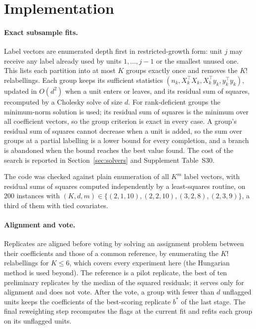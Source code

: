 \appendix

\section{Implementation}
\label{app:implementation}

\paragraph{Exact subsample fits.}
Label vectors are enumerated depth first in restricted-growth form: unit $j$ may receive any
label already used by units $1,\dots,j-1$ or the smallest unused one. This lists each
partition into at most $K$ groups exactly once and removes the $K!$ relabellings. Each group
keeps its sufficient statistics $(n_k,X_k^{\top}X_k,X_k^{\top}y_k,y_k^{\top}y_k)$, updated in
$O(d^{2})$ when a unit enters or leaves, and its residual sum of squares, recomputed by a
Cholesky solve of size $d$. For rank-deficient groups the minimum-norm solution is used; its
residual sum of squares is the minimum over all coefficient vectors, so the group criterion is
exact in every case. A group's residual sum of squares cannot decrease when a unit is added,
so the sum over groups at a partial labelling is a lower bound for every completion, and a
branch is abandoned when the bound reaches the best value found. The cost of the search is reported in Section~\ref{sec:solvers} and Supplement Table~S30.

The code was
checked against plain enumeration of all $K^{m}$ label vectors, with residual sums of squares
computed independently by a least-squares routine, on $200$ instances with
$(K,d,m)\in\{(2,1,10),(2,2,10),(3,2,8),(2,3,9)\}$, a third of them with tied covariates.

\paragraph{Alignment and vote.}
Replicates are aligned before voting by solving an assignment problem between their coefficients
and those of a common reference, by enumerating the $K!$ relabellings for $K\le6$, which covers
every experiment here (the Hungarian method \citep{kuhn1955hungarian} is used beyond). The
reference is a pilot replicate, the best of ten preliminary replicates by the median of the
squared residuals; it serves only for alignment and does not vote. After the vote, a group with
fewer than $d$ unflagged units keeps the coefficients of the best-scoring replicate $b^{\ast}$ of
the last stage. The final reweighting step recomputes the flags at the current fit and refits
each group on its unflagged units.

